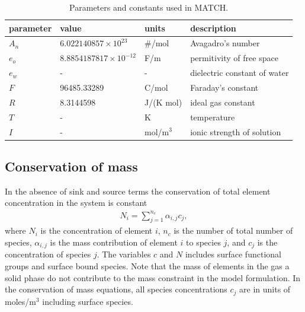 \documentclass{article}
\begin{document}
\begin{table}[H]
\centering
\caption{Parameters and constants used in MATCH.}
\label{table:params}
\begin{tabular}{l|l|l|l}
parameter       & value                      & units                     & description                           \\ \toprule
$A_n$           & $6.022140857 \times 10^{23}$           & \#/mol                   & Avagadro's number                      \\
$e_o$           & $8.8854187817 \times 10^{-12}$        & F/m                      & permitivity of free space                      \\
$e_w$           & -                          & -                        & dielectric constant of water                      \\
$F$             & 96485.33289                          & C/mol                        & Faraday's constant                      \\
$R$             & 8.3144598                          & J/(K mol)                        & ideal gas constant                      \\
$T$             & -                          & K                       & temperature                      \\
$I$             & -                          & mol/m$^3$                       & ionic strength of solution                      \\
\bottomrule
\end{tabular}
\end{table}


\subsection{Conservation of mass}
In the absence of sink and source terms the conservation of total element concentration in the system is constant
\begin{align}
    N_i = \sum_{j=1}^{n_c} \alpha_{i,j} c_j,
\end{align}
where $N_i$ is the concentration of element $i$, $n_c$ is the number of total number of species, $\alpha_{i,j}$ is the mass contribution of element $i$ to species $j$, and  $c_j$ is the concentration of species $j$. The variables $c$ and $N$ includes surface functional groups and surface bound species. Note that the mass of elements in the gas a solid phase do not contribute to the mass constraint in the model formulation. In the conservation of mass equations, all species concentrations $c_j$ are in units of moles/m$^3$ including surface species. 
\end{document}

